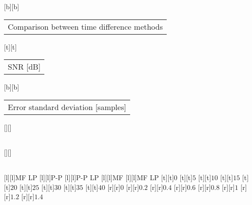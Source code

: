 %
[b][b]{\fontsize{8}{12}\selectfont \setlength{\tabcolsep}{0pt}\begin{tabular}{c}Comparison between time difference methods\end{tabular}}%
[t][t]{\fontsize{8}{12}\selectfont \setlength{\tabcolsep}{0pt}\begin{tabular}{c}SNR [dB]\end{tabular}}%
[b][b]{\fontsize{8}{12}\selectfont \setlength{\tabcolsep}{0pt}\begin{tabular}{c}Error standard deviation [samples]\end{tabular}}%
[][]{\fontsize{8}{12}\selectfont \setlength{\tabcolsep}{0pt}\begin{tabular}{c} \end{tabular}}%
[][]{\fontsize{4}{6}\selectfont \setlength{\tabcolsep}{0pt}\begin{tabular}{c} \end{tabular}}%
[l][l]{\fontsize{4}{6}\selectfont MF LP}%
[l][l]{\fontsize{4}{6}\selectfont P-P}%
[l][l]{\fontsize{4}{6}\selectfont P-P LP}%
[l][l]{\fontsize{4}{6}\selectfont MF}%
[l][l]{\fontsize{4}{6}\selectfont MF LP}%
%
\fontsize{6}{8}%
\selectfont%
%
[t][t]{$0$}%
[t][t]{$5$}%
[t][t]{$10$}%
[t][t]{$15$}%
[t][t]{$20$}%
[t][t]{$25$}%
[t][t]{$30$}%
[t][t]{$35$}%
[t][t]{$40$}%
%
[r][r]{$0$}%
[r][r]{$0.2$}%
[r][r]{$0.4$}%
[r][r]{$0.6$}%
[r][r]{$0.8$}%
[r][r]{$1$}%
[r][r]{$1.2$}%
[r][r]{$1.4$}%
%
%
